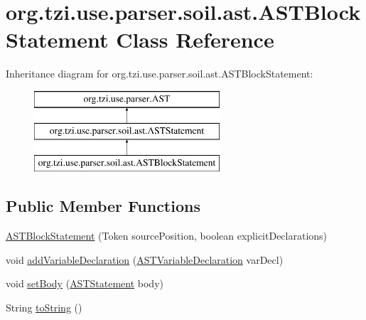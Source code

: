 \hypertarget{classorg_1_1tzi_1_1use_1_1parser_1_1soil_1_1ast_1_1_a_s_t_block_statement}{\section{org.\-tzi.\-use.\-parser.\-soil.\-ast.\-A\-S\-T\-Block\-Statement Class Reference}
\label{classorg_1_1tzi_1_1use_1_1parser_1_1soil_1_1ast_1_1_a_s_t_block_statement}
}
Inheritance diagram for org.\-tzi.\-use.\-parser.\-soil.\-ast.\-A\-S\-T\-Block\-Statement\-:\begin{figure}[H]
\begin{center}
\leavevmode
\includegraphics[height=3.000000cm]{classorg_1_1tzi_1_1use_1_1parser_1_1soil_1_1ast_1_1_a_s_t_block_statement}
\end{center}
\end{figure}
\subsection*{Public Member Functions}
\begin{DoxyCompactItemize}
\item 
\hyperlink{classorg_1_1tzi_1_1use_1_1parser_1_1soil_1_1ast_1_1_a_s_t_block_statement_ac5ce1d55d997820ed7c0a6bf11095731}{A\-S\-T\-Block\-Statement} (Token source\-Position, boolean explicit\-Declarations)
\item 
void \hyperlink{classorg_1_1tzi_1_1use_1_1parser_1_1soil_1_1ast_1_1_a_s_t_block_statement_a350d180d49fab1758d54adbc46da6e38}{add\-Variable\-Declaration} (\hyperlink{classorg_1_1tzi_1_1use_1_1parser_1_1ocl_1_1_a_s_t_variable_declaration}{A\-S\-T\-Variable\-Declaration} var\-Decl)
\item 
void \hyperlink{classorg_1_1tzi_1_1use_1_1parser_1_1soil_1_1ast_1_1_a_s_t_block_statement_a3d4c52d9462c32f259486dd726b6b371}{set\-Body} (\hyperlink{classorg_1_1tzi_1_1use_1_1parser_1_1soil_1_1ast_1_1_a_s_t_statement}{A\-S\-T\-Statement} body)
\item 
String \hyperlink{classorg_1_1tzi_1_1use_1_1parser_1_1soil_1_1ast_1_1_a_s_t_block_statement_a25430a9fea5b376d7886f43b6a2ec542}{to\-String} ()
\end{DoxyCompactItemize}
